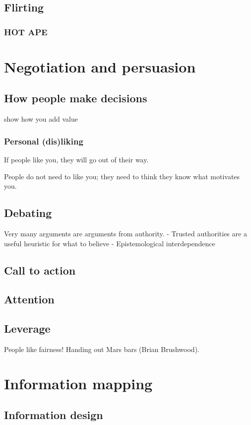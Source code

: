 \documentclass{report}
\begin{document}
\chapter{Flirting}
\section{HOT APE}

\part{Negotiation and persuasion}
\setcounter{chapter}{0} %
\chapter{How people make decisions}
show how you add value

\section{Personal (dis)liking}
If people like you, they will go out of their way.

People do not need to like you; they need to think they know what motivates you.

\chapter{Debating}
Very many arguments are arguments from authority.
- Trusted authorities are a useful heuristic for what to believe
- Epistemological interdependence

\chapter{Call to action}
\chapter{Attention}
\chapter{Leverage}
People like fairness! Handing out Mars bars (Brian Brushwood).

\part{Information mapping}
\setcounter{chapter}{0} %
\chapter{Information design}
\end{document}
